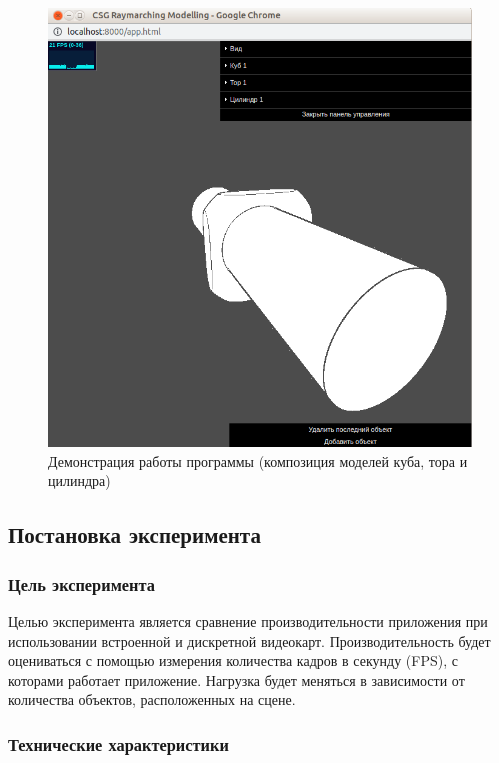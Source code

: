 \begin{figure}[h]
	\centering
	\captionsetup{justification=centering}
	\includegraphics[width=140mm]{img/example-2.png}
	\caption{Демонстрация  работы  программы  (композиция  моделей 
		куба, тора и цилиндра)}
	\label{fig:example-2}
\end{figure}

\subsection{Постановка эксперимента}
\subsubsection{Цель эксперимента}

Целью эксперимента является сравнение производительности приложения при использовании встроенной и 
дискретной видеокарт.
Производительность будет оцениваться с помощью измерения количества кадров в секунду (FPS), с которами работает приложение.
Нагрузка будет меняться в зависимости от количества объектов, расположенных на сцене.  

\subsubsection{Технические характеристики}

